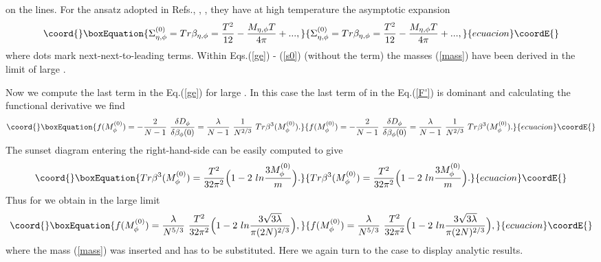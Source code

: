 \documentclass[a4paper,12pt]{article}
\begin{document}
 \myHighlight{$\beta_{\eta}, \beta_{\phi}$}\coordHE{} on the lines. For the ansatz adopted in
 Refs.\cite{prd}, \cite{pl}, \coordHE{}, they have at high temperature the asymptotic
 expansion
\begin{equation}\coord{}\boxEquation{ \label{s0}
\Sigma^{(0)}_{\eta, \phi} = Tr \beta_{\eta,\phi} = \frac{T^2}{12} -
\frac{M_{\eta,\phi} T}{4 \pi} + ... ,
}{ \Sigma^{(0)}_{\eta, \phi} = Tr \beta_{\eta,\phi} = \frac{T^2}{12} -
\frac{M_{\eta,\phi} T}{4 \pi} + ... ,
}{ecuacion}\coordE{}\end{equation}
where dots mark next-next-to-leading terms. Within Eqs.(\ref{ge}) -
(\ref{s0}) (without the \coordHE{} term) the masses (\ref{mass}) have
been derived in the limit of large \coordHE{}.

Now we compute the last term in the Eq.(\ref{ge}) for large \coordHE{}. In
this case the last term of \coordHE{} in the Eq.(\ref{F'}) is dominant
and calculating the functional derivative we find
\begin{equation}\coord{}\boxEquation{ \label{der}
f(M^{(0)}_{\phi}) = - \frac{2}{N - 1}~ \frac{\delta D_{\phi}}{\delta 
\beta_{\phi}(0)} = \frac{\lambda}{N - 1}~ \frac{1}{N^{2/3}}~ Tr \beta^3
(M^{(0)}_{\phi}).
}{ f(M^{(0)}_{\phi}) = - \frac{2}{N - 1}~ \frac{\delta D_{\phi}}{\delta 
\beta_{\phi}(0)} = \frac{\lambda}{N - 1}~ \frac{1}{N^{2/3}}~ Tr \beta^3
(M^{(0)}_{\phi}).
}{ecuacion}\coordE{}\end{equation}
The sunset diagram entering the right-hand-side can be easily computed
to give \cite{prd}
\begin{equation}\coord{}\boxEquation{ \label{der1}
 Tr \beta^3 (M^{(0)}_{\phi}) = \frac{T^2}{32 \pi^2}\Bigl ( 1 - 2~ ln
 \frac{3 M^{(0)}_{\phi}}{m}\Bigr) .
}{ Tr \beta^3 (M^{(0)}_{\phi}) = \frac{T^2}{32 \pi^2}\Bigl ( 1 - 2~ ln
 \frac{3 M^{(0)}_{\phi}}{m}\Bigr) .
}{ecuacion}\coordE{}\end{equation}
Thus for \coordHE{} we obtain in the large \coordHE{} limit
\begin{equation}\coord{}\boxEquation{ \label{f}
 f(M^{(0)}_{\phi})  = \frac{\lambda}{N^{5/3}}~ \frac{T^2}{32
 \pi^2}\Bigl ( 1 - 2~ ln \frac{3 \sqrt{3\lambda} }{\pi (2N)^{2/3}}\Bigr),
}{ f(M^{(0)}_{\phi})  = \frac{\lambda}{N^{5/3}}~ \frac{T^2}{32
 \pi^2}\Bigl ( 1 - 2~ ln \frac{3 \sqrt{3\lambda} }{\pi (2N)^{2/3}}\Bigr),
}{ecuacion}\coordE{}\end{equation}
where the mass \coordHE{} (\ref{mass}) was inserted and \coordHE{} has to be substituted. Here we again turn to the \coordHE{} case to
display analytic results.
\end{document}
